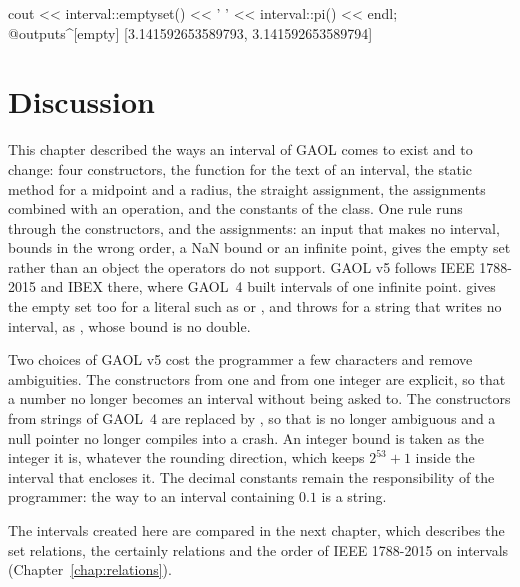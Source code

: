\begin{example}
cout << interval::emptyset() << ' ' << interval::pi() << endl;
@outputs^[empty] [3.141592653589793, 3.141592653589794]~
\end{example}

\section{Discussion}

This chapter described the ways an interval of GAOL comes to exist and to
change: four constructors, the function  for the text
of an interval, the static method  for a midpoint and a
radius, the straight assignment, the assignments combined with an operation,
and the constants of the class. One rule runs through the constructors,
 and the assignments: an input that makes no interval, bounds in
the wrong order, a NaN bound or an infinite point, gives the empty set rather
than an object the operators do not support. GAOL v5 follows IEEE 1788-2015
and IBEX there, where GAOL~4 built intervals of one infinite point.
 gives the empty set too for a literal such as
 or , and throws for a string that writes no
interval, as , whose bound  is no double.

\medskip
Two choices of GAOL v5 cost the programmer a few characters and remove
ambiguities. The constructors from one  and from one integer are
explicit, so that a number no longer becomes an interval without being asked
to. The constructors from strings of GAOL~4 are replaced by
, so that  is no longer ambiguous
and a null pointer no longer compiles into a crash. An integer
bound is taken as the integer it is, whatever the rounding direction, which
keeps $2^{53}+1$ inside the interval that encloses it. The decimal constants
remain the responsibility of the programmer: the way to an interval
containing $0.1$ is a string.

\medskip
The intervals created here are compared in the next chapter, which describes
the set relations, the certainly relations and the order of IEEE 1788-2015 on
intervals (Chapter~\ref{chap:relations}).
